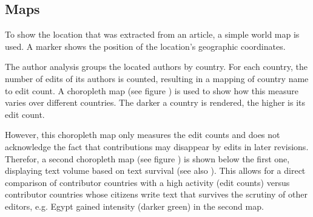 
\subsection{Maps}

To show the location that was extracted from an article, a simple world map is used.
A marker shows the position of the location's geographic coordinates.


The author analysis groups the located authors by country. 
For each country, the number of edits of its authors is counted, resulting in a mapping of country name to edit count.
A choropleth map (see figure ) is used to show how this measure varies over different countries.
The darker a country is rendered, the higher is its edit count.


However, this choropleth map only measures the edit counts and does not acknowledge the fact that contributions may disappear by edits in later revisions. 
Therefor, a second choropleth map (see figure ) is shown below the first one, displaying text volume  based on text survival (see also ).
This allows for a direct comparison of contributor countries with a high activity (edit counts) versus contributor countries whose citizens write text that survives the scrutiny of other editors, e.g. Egypt gained intensity (darker green) in the second map.

